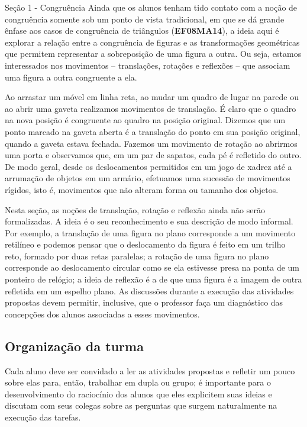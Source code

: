 \begin{paginatexto}{Seção 1 - Congruência}
Ainda que os alunos tenham tido contato com a noção de congruência somente sob um ponto de vista tradicional, em que se dá grande ênfase aos casos de congruência de triângulos (\textbf{EF08MA14}), a ideia aqui é explorar a relação entre a congruência de figuras e as transformações geométricas que permitem representar a sobreposição de uma figura a outra. Ou seja, estamos interessados nos movimentos – translações, rotações e reflexões – que associam uma figura a outra congruente a ela.

Ao arrastar um móvel em linha reta, ao mudar um quadro de lugar na parede ou ao abrir uma gaveta realizamos movimentos de translação. É claro que o quadro na nova posição é congruente ao quadro na posição original. Dizemos que um ponto marcado na gaveta aberta é a translação do ponto em sua posição original, quando a gaveta estava fechada. Fazemos um movimento de rotação ao abrirmos uma porta e observamos que, em um par de sapatos, cada pé é refletido do outro. De modo geral, desde os deslocamentos permitidos em um jogo de xadrez até a arrumação de objetos em um armário, efetuamos uma sucessão de movimentos rígidos, isto é, movimentos que não alteram forma ou tamanho dos objetos.

Nesta seção, as noções de translação, rotação e reflexão ainda não serão formalizadas. A ideia é o seu reconhecimento e sua descrição de modo informal. Por exemplo, a translação de uma figura no plano corresponde a um movimento retilíneo e podemos pensar que o deslocamento da figura é feito em um trilho reto, formado por duas retas paralelas; a rotação de uma figura no plano corresponde ao deslocamento circular como se ela estivesse presa na ponta de um ponteiro de relógio; a ideia de reflexão é a de que uma figura é a imagem de outra refletida em um espelho plano. As discussões durante a execução das atividades propostas devem permitir, inclusive, que o professor faça um diagnóstico das concepções dos alunos associadas a esses movimentos.

\subsection{Organização da turma}
Cada aluno deve ser convidado a ler as atividades propostas e refletir um pouco sobre elas para, então, trabalhar em dupla ou grupo; é importante para o desenvolvimento do raciocínio dos alunos que eles explicitem suas ideias e discutam com seus colegas sobre as perguntas que surgem naturalmente na execução das tarefas. 


\end{paginatexto}
